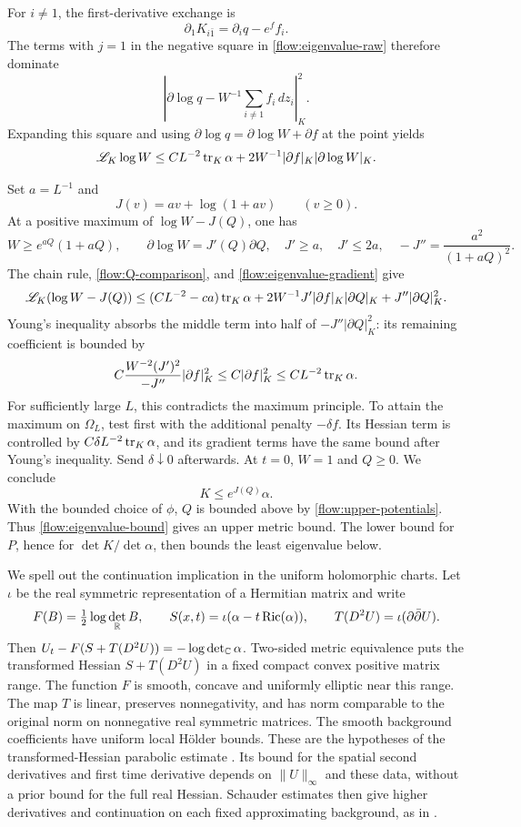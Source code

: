 For $i\ne1$, the first-derivative exchange is
\[
 \partial_1K_{i\bar1}=\partial_iq-e^ff_i.
\]
The terms with $j=1$ in the negative square in
\eqref{flow:eigenvalue-raw} therefore dominate
\[
 \left|\partial\log q-W^{-1}\sum_{i\ne1}f_i\,dz_i\right|_K^2.
\]
Expanding this square and using
$\partial\log q=\partial\log W+\partial f$ at the point yields
\begin{equation}\label{flow:eigenvalue-gradient}
 \mathscr L_K\log W
 \le CL^{-2}\operatorname{tr}_K\alpha
       +2W^{-1}|\partial f|_K|\partial\log W|_K.
\end{equation}

Set $a=L^{-1}$ and
\[
 J(v)=av+\log(1+av)\qquad(v\ge0).
\]
At a positive maximum of $\log W-J(Q)$, one has
\[
 W\ge e^{aQ}(1+aQ),\qquad
 \partial\log W=J'(Q)\partial Q,
 \quad J'\ge a,\quad J'\le2a,\quad
 -J''=\frac{a^2}{(1+aQ)^2}.
\]
The chain rule, \eqref{flow:Q-comparison}, and
\eqref{flow:eigenvalue-gradient} give
\[
 \mathscr L_K(\log W-J(Q))
 \le (CL^{-2}-ca)\operatorname{tr}_K\alpha
 +2W^{-1}J'|\partial f|_K|\partial Q|_K
 +J''|\partial Q|_K^2.
\]
Young's inequality absorbs the middle term into half of
$-J''|\partial Q|_K^2$: its remaining coefficient is bounded by
\[
 C\frac{W^{-2}(J')^2}{-J''}|\partial f|_K^2
 \le C|\partial f|_K^2
 \le CL^{-2}\operatorname{tr}_K\alpha.
\]
For sufficiently large $L$, this contradicts the maximum principle.
To attain the maximum on $\Omega_L$, test first with the additional
penalty $-\delta f$.  Its Hessian term is controlled by
$C\delta L^{-2}\operatorname{tr}_K\alpha$, and its gradient terms have the same
bound after Young's inequality.  Send $\delta\downarrow0$ afterwards.
At $t=0$, $W=1$ and $Q\ge0$.  We conclude
\begin{equation}\label{flow:eigenvalue-bound}
 K\le e^{J(Q)}\alpha.
\end{equation}
With the bounded choice of $\phi$, $Q$ is bounded above by
\eqref{flow:upper-potentials}.  Thus \eqref{flow:eigenvalue-bound}
gives an upper metric bound.  The lower bound for $P$, hence for
$\det K/\det\alpha$, then bounds the least eigenvalue below.

We spell out the continuation implication in the uniform holomorphic
charts.  Let $\iota$ be the real symmetric representation of a Hermitian
matrix and write
\[
 F(B)=\tfrac12\log\det_{\mathbb R}B,\qquad
 S(x,t)=\iota(\alpha-t\operatorname{Ric}(\alpha)),\qquad
 T(D^2U)=\iota(\partial\bar\partial U).
\]
Then $U_t-F(S+T(D^2U))=-\log\det_{\mathbb C}\alpha$.
Two-sided metric equivalence puts the transformed Hessian $S+T(D^2U)$
in a fixed compact convex positive matrix range.  The function $F$
is smooth, concave and uniformly elliptic near this range.  The map
$T$ is linear, preserves nonnegativity, and has norm comparable to
the original norm on nonnegative real symmetric matrices.  The smooth
background coefficients have uniform local H\"older bounds.
These are the hypotheses of the transformed-Hessian parabolic
estimate \cite[Theorem~5.1]{ChuRegularity}.  Its bound for the spatial
second derivatives and first time derivative depends on $\|U\|_\infty$
and these data, without a prior bound for the full real Hessian.
Schauder estimates then give higher derivatives and continuation on
each fixed approximating background, as in
\cite[proof of Theorem~4.1]{LeeTam}.

